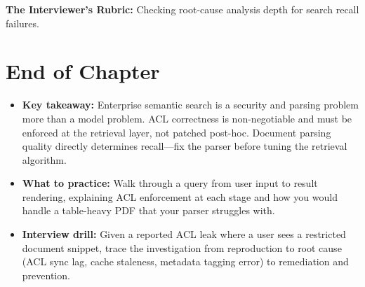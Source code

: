 \textbf{The Interviewer's Rubric:} Checking root-cause analysis depth for search recall failures.

\section*{End of Chapter}

\begin{itemize}
  \item \textbf{Key takeaway:} Enterprise semantic search is a security and parsing problem more than a model problem. ACL correctness is non-negotiable and must be enforced at the retrieval layer, not patched post-hoc. Document parsing quality directly determines recall---fix the parser before tuning the retrieval algorithm.
  \item \textbf{What to practice:} Walk through a query from user input to result rendering, explaining ACL enforcement at each stage and how you would handle a table-heavy PDF that your parser struggles with.
  \item \textbf{Interview drill:} Given a reported ACL leak where a user sees a restricted document snippet, trace the investigation from reproduction to root cause (ACL sync lag, cache staleness, metadata tagging error) to remediation and prevention.
\end{itemize}
